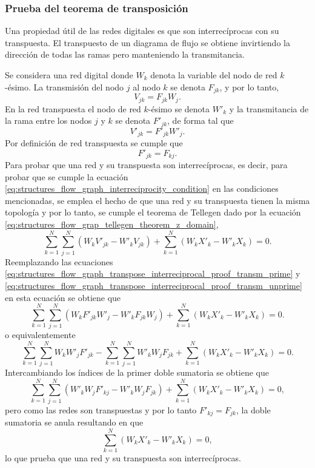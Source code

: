 \documentclass[a4paper]{report}
\begin{document}
\subsubsection{Prueba del teorema de transposición}

Una propiedad útil de las redes digitales es que son interrecíprocas con su transpuesta. El transpuesto de un diagrama de flujo se obtiene invirtiendo la dirección de todas las ramas pero manteniendo la transmitancia.

Se considera una red digital donde \(W_k\) denota la variable del nodo de red \(k\)-ésimo. La transmisión del nodo \(j\) al nodo \(k\) se denota \(F_{jk}\), y por lo tanto,
\begin{equation}\label{eq:structures_flow_graph_transpose_interreciprocal_proof_transm_prime}
 V_{jk}=F_{jk}W_j. 
\end{equation}
En la red transpuesta el nodo de red \(k\)-ésimo se denota \(W'_k\) y la transmitancia de la rama entre los nodos \(j\) y \(k\) se denota \(F'_{jk}\), de forma tal que 
\begin{equation}\label{eq:structures_flow_graph_transpose_interreciprocal_proof_transm_unprime}
 V'_{jk}=F'_{jk}W'_j. 
\end{equation}
Por definición de red transpuesta se cumple que
\[
 F'_{jk}=F_{kj}.
\]
Para probar que una  red y su transpuesta son interrecíprocas, es decir, para probar que se cumple la ecuación \ref{eq:structures_flow_graph_interreciprocity_condition} en las condiciones mencionadas, se emplea el hecho de que una red y su transpuesta tienen la misma topología y por lo tanto, se cumple el teorema de Tellegen dado por la ecuación \ref{eq:structures_flow_grap_tellegen_theorem_z_domain},
\[
 \sum_{k=1}^N\sum_{j=1}^N(W_kV'_{jk}-W'_kV_{jk})+\sum_{k=1}^N(W_kX'_k-W'_kX_k)=0.
\]
Reemplazando las ecuaciones \ref{eq:structures_flow_graph_transpose_interreciprocal_proof_transm_prime} y \ref{eq:structures_flow_graph_transpose_interreciprocal_proof_transm_unprime} en esta ecuación se obtiene que 
\[
 \sum_{k=1}^N\sum_{j=1}^N(W_kF'_{jk}W'_j-W'_kF_{jk}W_j)+\sum_{k=1}^N(W_kX'_k-W'_kX_k)=0.
\]
o equivalentemente
\[
 \sum_{k=1}^N\sum_{j=1}^NW_kW'_jF'_{jk}-\sum_{k=1}^N\sum_{j=1}^NW'_kW_jF_{jk}+\sum_{k=1}^N(W_kX'_k-W'_kX_k)=0.
\]
Intercambiando los índices de la primer doble sumatoria se obtiene que 
\[
 \sum_{k=1}^N\sum_{j=1}^N(W'_kW_jF'_{kj}-W'_kW_jF_{jk})+\sum_{k=1}^N(W_kX'_k-W'_kX_k)=0,
\] 
pero como las redes son transpuestas y por lo tanto \(F'_{kj}=F_{jk}\), la doble sumatoria se anula resultando en que 
\begin{equation}\label{eq:structures_flow_graph_transpose_interreciprocal_proof}
 \sum_{k=1}^N(W_kX'_k-W'_kX_k)=0, 
\end{equation}
lo que prueba que una red y su transpuesta son interrecíprocas.  
 
\end{document}
